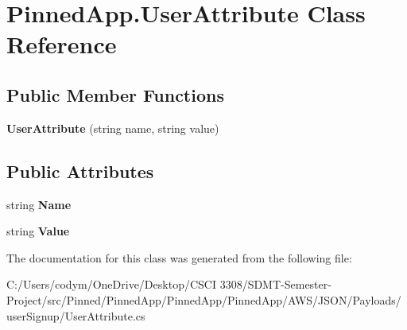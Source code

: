 \hypertarget{class_pinned_app_1_1_user_attribute}{}\section{Pinned\+App.\+User\+Attribute Class Reference}
\label{class_pinned_app_1_1_user_attribute}
\subsection*{Public Member Functions}
\begin{DoxyCompactItemize}
\item 
\mbox{\label{class_pinned_app_1_1_user_attribute_a86062918ca497d13c50a2bde92e2c8f4}} 
{\bfseries User\+Attribute} (string name, string value)
\end{DoxyCompactItemize}
\subsection*{Public Attributes}
\begin{DoxyCompactItemize}
\item 
\mbox{\label{class_pinned_app_1_1_user_attribute_a2c679ae89dbd932d68c5633e0c1a20bb}} 
string {\bfseries Name}
\item 
\mbox{\label{class_pinned_app_1_1_user_attribute_af342fd3249d126233173ac14cc84957a}} 
string {\bfseries Value}
\end{DoxyCompactItemize}


The documentation for this class was generated from the following file\+:\begin{DoxyCompactItemize}
\item 
C\+:/\+Users/codym/\+One\+Drive/\+Desktop/\+C\+S\+C\+I 3308/\+S\+D\+M\+T-\/\+Semester-\/\+Project/src/\+Pinned/\+Pinned\+App/\+Pinned\+App/\+Pinned\+App/\+A\+W\+S/\+J\+S\+O\+N/\+Payloads/user\+Signup/User\+Attribute.\+cs\end{DoxyCompactItemize}

